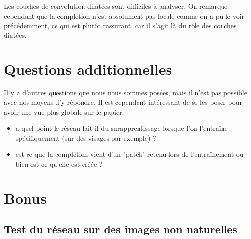 \documentclass[12pt]{article}
\begin{document}
Les couches de convolution dilatées sont difficiles à analyser. On remarque cependant que la complétion n'est absolument pas locale comme on a pu le voir précédemment, ce qui est plutôt rassurant, car il s'agit là du rôle des couches diatées.

\section{Questions additionnelles}

Il y a d'autres questions que nous nous sommes posées, mais il n'est pas possible avec nos moyens d'y répondre. Il est cependant intéressant de se les poser pour avoir une vue plus globale sur le papier.
\begin{itemize}
    \item a quel point le réseau fait-il du surapprentissage lorsque l'on l'entraîne spécifiquement (sur des visages par exemple) ?
    \item est-ce que la complétion vient d'un "patch" retenu lors de l'entraînement ou bien est-ce qu'elle est créée ?
\end{itemize}

\newpage

\section{Bonus}

\subsection{Test du réseau sur des images non naturelles}
\end{document}
